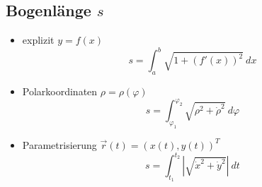 \subsection{Bogenlänge \hfill $s\ $}
    \begin{itemize}
        \item explizit $y = f(x)$
            $$
                s = \int_a^b \sqrt{1 + \left( f'(x) \right)^2} \ dx
            $$
        \item Polarkoordinaten $\rho = \rho(\varphi)$
            $$
                s = \int_{\varphi_1}^{\varphi_2} \sqrt{\rho^2 + \dot{\rho}^2} \ d\varphi
            $$
        \item Parametrisierung $\vec{r}(t) = (x(t),y(t))^T$
            $$
                s = \int_{t_1}^{t_2} \left\lvert \sqrt{\dot{x}^2 + \dot{y}^2} \right\rvert \ dt
            $$
    \end{itemize}